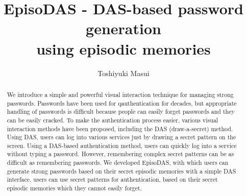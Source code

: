 \documentclass[sigconf]{acmart}
\begin{document}
\title{EpisoDAS - DAS-based password generation \\
using episodic memories}

\author{Toshiyuki Masui}

\renewcommand{\shortauthors}{T. Masui}

\begin{abstract}

We introduce a simple and powerful visual interaction technique for
managing strong passwords.  Passwords have been used for
qauthentication for decades, but appropriate handling of passwords is
difficult because people can easily forget passwords and they can be
easily cracked.
%
To make the authentication process easier, various visual interaction
methods have been proposed, including the DAS (draw-a-secret)
method. Using DAS, users can log into various services just by drawing
a secret pattern on the screen.
%
Using a DAS-based authentication method, users can quickly log into a
service without typing a password. However, remembering complex secret
patterns can be as difficult as remembering passwords. We developed
EpisoDAS, with which users can generate strong passwords based on
their secret episodic memories with a simple DAS interface.
%
users can use secret patterns for authentication, based on their
secret episodic memories which they cannot easily forget.

\end{abstract}

%
%
\end{document}
